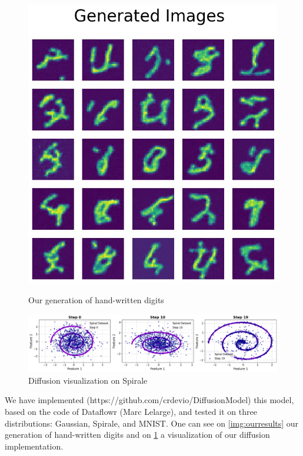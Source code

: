 \documentclass[a4paper,11pt]{article}
\begin{document}
\begin{figure}[h]
    \centering
    \begin{minipage}[b]{0.3\textwidth}
        \centering
        \includegraphics[width=\textwidth]{imgs/mnist_res.jpg}
        \caption{Our generation of hand-written digits}
        \label{img:ourresults}
    \end{minipage}
    \hfill
    \begin{minipage}[b]{0.65\textwidth}
        \centering
        \includegraphics[width=\textwidth]{imgs/res_spirale.png}
        \caption{Diffusion visualization on Spirale}
        \label{img:spiralresults}
    \end{minipage}
\end{figure}


We have implemented (https://github.com/crdevio/DiffusionModel) this model, based on the code of Dataflowr (Marc Lelarge), and tested it on three distributions: Gaussian, Spirale, and MNIST. One can see on \cref{img:ourresults} our generation of hand-written digits and on \cref{img:spiralresults} a visualization of our diffusion implementation.
\end{document}
